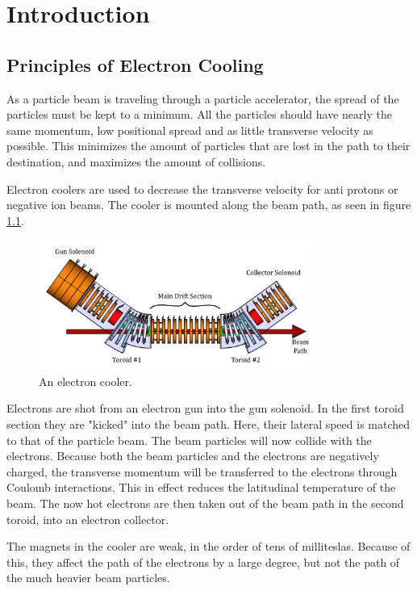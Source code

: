 \chapter{Introduction}

\section{Principles of Electron Cooling}
As a particle beam is traveling through a particle accelerator, the spread
of the particles must be kept to a minimum. All the particles should have
nearly the same momentum, low positional spread and as little transverse
velocity as possible. This minimizes the amount of particles that are lost
in the path to their destination, and maximizes the amount of collisions.

Electron coolers are used to decrease the transverse velocity for anti protons
or negative ion beams. The cooler is mounted along the beam path, as seen in
figure \ref{fig:ecooler}.

\begin{figure}[!h]
    \centering
    \includegraphics[width=0.8\textwidth]{figs/ecooler.png}
    \caption{An electron cooler.}
    \label{fig:ecooler}
\end{figure}

Electrons are shot from an electron gun into the gun solenoid. In the
first toroid section they are "kicked" into the beam path. Here, their
lateral speed is matched to that of the particle beam. The beam particles
will now collide with the electrons. Because both the beam particles and
the electrons are negatively charged, the transverse momentum will be
transferred to the electrons through Coulomb interactions. This in effect
reduces the latitudinal temperature of the beam. The now hot electrons are
then taken out of the beam path in the second toroid, into an electron collector.

The magnets in the cooler are weak, in the order of tens of milliteslas.
Because of this, they affect the path of the electrons by a large degree, but
not the path of the much heavier beam particles.

